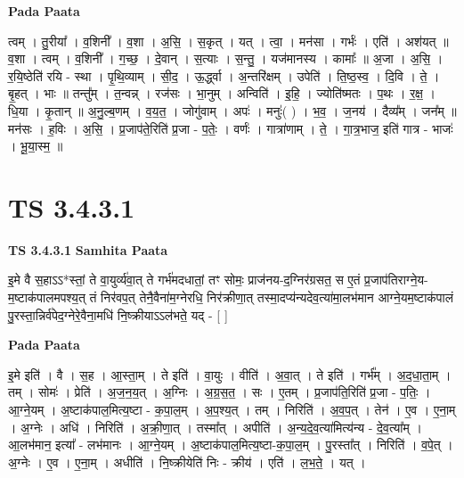\documentclass[17pt]{extarticle}
\begin{document}
\textbf{Pada Paata} \newline

त्वम् । तु॒रीया᳚ । व॒शिनी᳚ । व॒शा । अ॒सि॒ । स॒कृत् । यत् । त्वा॒ । मन॑सा । गर्भः॑ । एति॑ । अश॑यत् ॥ व॒शा । त्वम् । व॒शिनी᳚ । ग॒च्छ॒ । दे॒वान् । स॒त्याः । स॒न्तु॒ । यज॑मानस्य । कामाः᳚ ॥ अ॒जा । अ॒सि॒ । र॒यि॒ष्ठेति॑ रयि - स्था । पृ॒थि॒व्याम् । सी॒द॒ । ऊ॒र्द्ध्वा । अ॒न्तरि॑क्षम् । उपेति॑ । ति॒ष्ठ॒स्व॒ । दि॒वि । ते॒ । बृ॒हत् । भाः ॥ तन्तु᳚म् । त॒न्वन्न् । रज॑सः । भा॒नुम् । अन्विति॑ । इ॒हि॒ । ज्योति॑ष्मतः । प॒थः । र॒क्ष॒ । धि॒या । कृ॒तान् ॥ अ॒नु॒ल्ब॒णम् । व॒य॒त॒ । जोगु॑वाम् । अपः॑ । मनुः॑( ) । भ॒व॒ । ज॒नय॑ । दैव्य᳚म् । जन᳚म् ॥ मन॑सः । ह॒विः । अ॒सि॒ । प्र॒जाप॑ते॒रिति॑ प्र॒जा - प॒तेः॒ । वर्णः॑ । गात्रा॑णाम् । ते॒ । गा॒त्र॒भाज॒ इति॑ गात्र - भाजः॑ । भू॒या॒स्म॒ ॥  \newline




\section*{ TS 3.4.3.1 }

\textbf{TS 3.4.3.1 } \newline
\textbf{Samhita Paata} \newline

इ॒मे वै स॒हाऽऽ*स्तां॒ ते वा॒युर्व्य॑वा॒त् ते गर्भ॑मदधातां॒ तꣳ सोमः॒ प्राज॑नय-द॒ग्निर॑ग्रसत॒ स ए॒तं प्र॒जाप॑तिराग्ने॒य-म॒ष्टाक॑पालमपश्य॒त् तं निर॑वप॒त् तेनै॒वैना॑म॒ग्नेरधि॒ निर॑क्रीणा॒त् तस्मा॒दप्य॑न्यदेव॒त्या॑मा॒लभ॑मान आग्ने॒यम॒ष्टाक॑पालं पु॒रस्ता॒न्निर्व॑पेद॒ग्नेरे॒वैना॒मधि॑ नि॒ष्क्रीयाऽऽल॑भते॒ यद् - [  ] \newline

\textbf{Pada Paata} \newline

इ॒मे इति॑ । वै । स॒ह । आ॒स्ता॒म् । ते इति॑ । वा॒युः । वीति॑ । अ॒वा॒त् । ते इति॑ । गर्भ᳚म् । अ॒द॒धा॒ता॒म् । तम् । सोमः॑ । प्रेति॑ । अ॒ज॒न॒य॒त् । अ॒ग्निः । अ॒ग्र॒स॒त॒ । सः । ए॒तम् । प्र॒जाप॑ति॒रिति॑ प्र॒जा - प॒तिः॒ । आ॒ग्ने॒यम् । अ॒ष्टाक॑पाल॒मित्य॒ष्टा - क॒पा॒ल॒म् । अ॒प॒श्य॒त् । तम् । निरिति॑ । अ॒व॒प॒त् । तेन॑ । ए॒व । ए॒ना॒म् । अ॒ग्नेः । अधि॑ । निरिति॑ । अ॒क्री॒णा॒त् । तस्मा᳚त् । अपीति॑ । अ॒न्य॒दे॒व॒त्या॑मित्य॑न्य - दे॒व॒त्या᳚म् । आ॒लभ॑मान॒ इत्या᳚ - लभ॑मानः । आ॒ग्ने॒यम् । अ॒ष्टाक॑पाल॒मित्य॒ष्टा-क॒पा॒ल॒म् । पु॒रस्ता᳚त् । निरिति॑ । व॒पे॒त् । अ॒ग्नेः । ए॒व । ए॒ना॒म् । अधीति॑ । नि॒ष्क्रीयेति॑ निः - क्रीय॑ । एति॑ । ल॒भ॒ते॒ । यत् ।  \newline
\end{document}
